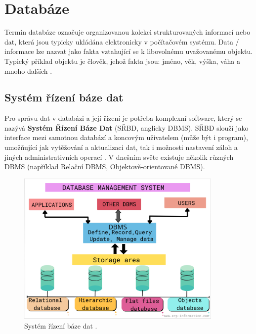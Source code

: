 
\chapter{Databáze} \label{chap:databaze}

Termín databáze označuje organizovanou kolekci strukturovaných informací nebo dat, která jsou typicky ukládána elektronicky v počítačovém systému. Data / informace lze nazvat jako fakta vztahující se k libovolnému uvažovanému objektu. Typický příklad objektu je člověk, jehož fakta jsou: jméno, věk, výška, váha a mnoho dalších \cite{databaseIntroduction}.\newline

\section{Systém řízení báze dat}
Pro správu dat v databázi a její řízení je potřeba komplexní software, který se nazývá \textbf{Systém Řízení Báze Dat} (SŘBD, anglicky \gls{DBMS}). SŘBD slouží jako interface mezi samotnou databází a koncovým uživatelem (může být i program), umožňující jak vytěžování a aktualizaci dat, tak i možnosti nastavení záloh a jiných administrativních operací \cite{OracleDB}. V dnešním světe existuje několik různých \gls{DBMS} (například Relační \gls{DBMS}, Objektově-orientované \gls{DBMS}).
\begin{figure}[h!]
\centering
\includegraphics[width=10cm]{img/databaze/dbms}
\caption{Systém řízení báze dat \cite{img_dbms}.}
\label{fig:dbms}
\end{figure}


